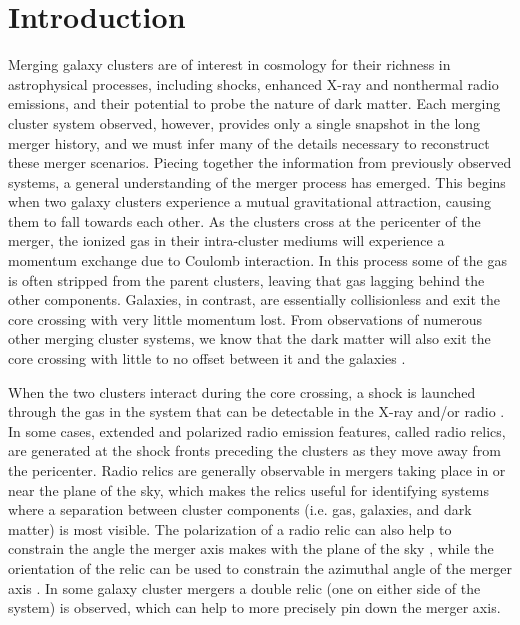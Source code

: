 \documentclass[onecolumn]{aastex}
\begin{document}

\section{Introduction}

Merging galaxy clusters are of interest in cosmology for their richness in astrophysical processes, including shocks, enhanced X-ray and nonthermal radio emissions, and their potential to probe the nature of dark matter.  Each merging cluster system observed, however, provides only a single snapshot in the long merger history, and we must infer many of the details necessary to reconstruct these merger scenarios.  Piecing together the information from previously observed systems, a general understanding of the merger process has emerged.  This begins when two galaxy clusters experience a mutual gravitational attraction, causing them to fall towards each other.  As the clusters cross at the pericenter of the merger, the ionized gas in their intra-cluster mediums will experience a momentum exchange due to Coulomb interaction.  In this process some of the gas is often stripped from the parent clusters, leaving that gas lagging behind the other components.  Galaxies, in contrast, are essentially collisionless and exit the core crossing with very little momentum lost.  From observations of numerous other merging cluster systems, we know that the dark matter will also exit the core crossing with little to no offset between it and the galaxies \citep{Randall07, Dawson12, Ng15}.

When the two clusters interact during the core crossing, a shock is launched through the gas in the system that can be detectable in the X-ray and/or radio \citep{Ensslin98, Markevitch02}.  In some cases, extended and polarized radio emission features, called radio relics, are generated at the shock fronts preceding the clusters as they move away from the pericenter.  Radio relics are generally observable in mergers taking place in or near the plane of the sky, which makes the relics useful for identifying systems where a separation between cluster components (i.e. gas, galaxies, and dark matter) is most visible.  The polarization of a radio relic can also help to constrain the angle the merger axis makes with the plane of the sky \citep{Ng15, Ensslin98}, while the orientation of the relic can be used to constrain the azimuthal angle of the merger axis \citep{vanWeeren11}.  In some galaxy cluster mergers a double relic (one on either side of the system) is observed, which can help to more precisely pin down the merger axis.   
\end{document}
